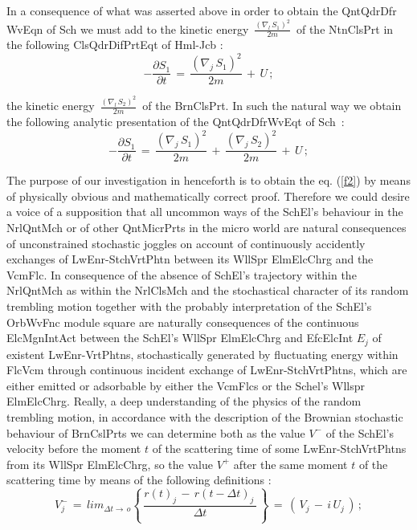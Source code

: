 \documentclass[12pt]{article}
\begin{document}
 In a consequence of what was asserted above in order to obtain the QntQdrDfr
WvEqn of Sch we must add to the kinetic energy $\,\frac{(\nabla_l\,S_1)^2}
{2m}\,$ of the NtnClsPrt in the following ClsQdrDifPrtEqt of Hml-Jcb :
\begin{equation}\label{f1}
 -\frac{\partial S_1}{\partial t}\,=\,\frac{(\nabla_j\,S_1)^2}{2m}\,+\,U\,;
\end{equation}

the kinetic energy $\,\frac{(\nabla_l\,S_2)^2}{2m}\,$ of the BrnClsPrt. In
such the natural way we obtain the following analytic presentation of the
QntQdrDfrWvEqt of Sch \,:
\begin{equation}\label{f2}
 -\frac{\partial S_1}{\partial t}\,=\,\frac{(\nabla_j\,S_1)^2}{2m}\,+
\,\frac{(\nabla_j\,S_2)^2}{2m}\,+\,U\,;
\end{equation}

 The purpose of our investigation in henceforth is to obtain the eq.
(\ref{f2}) by means of physically obvious and mathematically correct proof.
Therefore we could desire a voice of a supposition that all uncommon ways
of the SchEl's behaviour in the NrlQntMch or of other QntMicrPrts in the
micro world are natural consequences of unconstrained stochastic joggles
on account of continuously accidently exchanges of LwEnr-StchVrtPhtn between
its WllSpr ElmElcChrg and the VcmFlc. In consequence of the absence of
SchEl's trajectory within the NrlQntMch as within the NrlClsMch and the
stochastical character of its random trembling motion together with the
probably interpretation of the SchEl's OrbWvFnc module square are naturally
consequences of the continuous ElcMgnIntAct between the SchEl's WllSpr
ElmElcChrg and EfcElcInt $E_j$ of existent LwEnr-VrtPhtns, stochastically
generated by fluctuating energy within FlcVcm through continuous incident
exchange of LwEnr-StchVrtPhtns, which are either emitted or adsorbable by
either the VcmFlcs or the Schel's Wllspr ElmElcChrg. Really, a deep
understanding of the physics of the random trembling motion, in accordance
with the description of the Brownian stochastic behaviour of BrnCslPrts we
can determine both as the value $V^{-}$ of the SchEl's velocity before the
moment $t$ of the scattering time of some LwEnr-StchVrtPhtns from its WllSpr
ElmElcChrg, so the value $V^{+}$ after the same moment $t$ of the scattering
time by means of the following definitions :
\begin{equation}\label{q1}
V_j^{-}\,=\,lim_{\Delta t\to\,o} \left\{\,\frac{r(t)_j\,-\,r(t-\Delta t)_j\,}
{\Delta t}\,\right\}\,= \,(\,V_j\,-\,i\,U_j\,)\,;
\end{equation}
\end{document}
